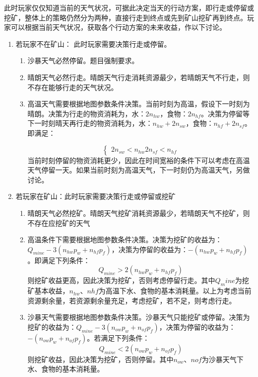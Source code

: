 \documentclass[withoutpre]{cumcmthesis} %
\begin{document}
此时玩家仅仅知道当前的天气状况，可据此决定当天的行动方案，即行走或停留或挖矿，整体上的策略仍然分为两种，直接行走到终点或先到矿山挖矿再到终点。玩家可以根据当前天气状况，获取各个行动方案的未来收益，作以下讨论。
\begin{enumerate}
    \item 若玩家不在矿山：
    此时玩家需要决策行走或停留。
    \begin{enumerate}
        \item 沙暴天气必然停留。题目强制要求。
        \item 晴朗天气必然行走。晴朗天气行走消耗资源最少，若晴朗天气不行走，则不存在能够行走的天气状况。
        \item 高温天气需要根据地图参数条件决策。当前时刻为高温，假设下一时刻为晴朗。决策为行走的物资消耗为，水：$2n_{hw}$，食物：$2n_{hf}$。决策为停留等下一时刻晴天再行走的物资消耗为，水：$n_{hw} + 2n_{sw}$，食物：$n_{hf} + 2n_{sf}$。即满足：

        \begin{equation}
            \left\{
                \begin{array}{lr}
                    2n_{sw} < n_{hw}  
                    2n_{sf} < n_{hf}
                \end{array}
            \right.
            \label{equa:1}
        \end{equation}
        当前时刻停留的物资消耗更少，因此在时间宽裕的条件下可以考虑在高温天气停留一天。如果当前时刻为高温天气，下一时刻仍为高温天气，另做讨论。
    \end{enumerate}
    \item 若玩家在矿山：此时玩家需要决策行走或停留或挖矿
    \begin{enumerate}
        \item 晴朗天气必然挖矿。晴朗天气挖矿消耗资源最少，若晴朗天气不挖矿，则不存在应挖矿的天气
        \item 高温条件下需要根据地图参数条件决策。决策为挖矿的收益为：$Q_{mine} - 3(n_{hw}p_w + n_{hf}p_f)$，决策为停留的收益为：$-(n_{hw}p_w + n_{hf}p_f)$。即满足下列条件：
        \begin{equation}
            Q_{mine} > 2(n_{hw}p_w + n_{hf}p_f)
            \label{equa:2}
        \end{equation}
        则挖矿收益更高，因此决策为挖矿，否则考虑停留行走。其中$Q_mine$为挖矿基本收益，$n_{hw}$、$n{hf}$为高温下水、食物的基本消耗量。以上为考虑当前资源剩余量，若资源剩余量充足，考虑挖矿，若不足，则考虑行走。
        \item 沙暴天气需要根据地图参数条件决策。沙暴天气只能挖矿或停留。决策为挖矿的收益为：$Q_{mine} - 3(n_{ow}p_w + n_{of}p_f)$，决策为停留的收益为：$-(n_{ow}p_w + n_{of}p_f)$。若满足下列条件：
        \begin{equation}
            Q_{mine} < 2(n_{ow}p_w + n_{of}p_f)
            \label{equa:3}
        \end{equation}
        则挖矿收益，因此决策为挖矿，否则停留。其中$n_{ow}$、$n{of}$为沙暴天气下水、食物的基本消耗量。
    \end{enumerate}
\end{enumerate}
\end{document}
